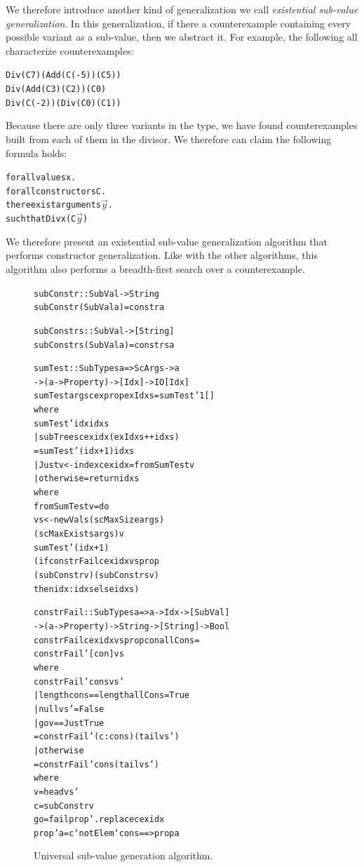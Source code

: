 \documentclass{sigplanconf}
\newenvironment{code}{\begin{alltt}}{\end{alltt}}
\begin{document}
We therefore introduce another kind of generalization we call \emph{existential
  sub-value generalization}.  In this generalization, if there a counterexample
containing every possible variant as a sub-value, then we abstract it.  For
example, the following all characterize counterexamples:
%
\begin{code}
Div (C 7) (Add (C (-5)) (C 5))
Div (Add (C 3) (C 2)) (C 0)
Div (C (-2)) (Div (C 0) (C 1))
\end{code}
%
\noindent
Because there are only three variants in the type, we have found counterexamples
built from each of them in the divisor.  We therefore can claim the following
formula holds:
%
\begin{code}
forall values x .
  forall constructors C .
    there exist arguments \(\stackrel{\rightarrow}{y}\) .
      such that Div x (C\(\stackrel{\rightarrow}{y}\))
\end{code}
%
\noindent
We therefore present an existential sub-value generalization algorithm that
performs constructor generalization.  Like with the other algorithms, this
algorithm also performs a breadth-first search over a counterexample.

\begin{figure}
  \begin{code}
subConstr :: SubVal -> String
subConstr (SubVal a) = constr a

subConstrs :: SubVal -> [String]
subConstrs (SubVal a) = constrs a

sumTest :: SubTypes a => ScArgs -> a
  -> (a -> Property) -> [Idx] -> IO [Idx]
sumTest args cex prop exIdxs = sumTest' 1 []
  where
  sumTest' idx idxs
    | subTrees cex idx (exIdxs ++ idxs)
    = sumTest' (idx+1) idxs
    | Just v <- index cex idx = fromSumTest v
    | otherwise = return idxs
    where
    fromSumTest v = do
      vs <- newVals (scMaxSize args)
              (scMaxExists args) v
      sumTest' (idx+1)
        (if constrFail cex idx vs prop
           (subConstr v) (subConstrs v)
           then idx:idxs else idxs)

constrFail :: SubTypes a => a -> Idx -> [SubVal]
  -> (a -> Property) -> String -> [String] -> Bool
constrFail cex idx vs prop con allCons =
  constrFail' [con] vs
  where
  constrFail' cons vs'
    | length cons == length allCons = True
    | null vs'                      = False
    | go v == Just True
    = constrFail' (c:cons) (tail vs')
    | otherwise
    = constrFail' cons (tail vs')
    where
    v  = head vs'
    c  = subConstr v
    go = fail prop' . replace cex idx
    prop' a = c `notElem` cons ==> prop a
  \end{code}
  \caption{Universal sub-value generation algorithm.}
  \label{fig:constrs}
\end{figure}
\end{document}
